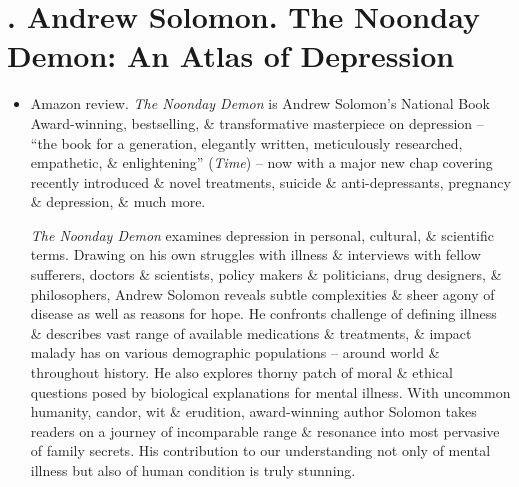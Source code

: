 \documentclass{article}
\begin{document}
\section{\cite{Solomon_depression}. {\sc Andrew Solomon}. The Noonday Demon: An Atlas of Depression}
{}
\begin{itemize}
	\item {\sf Amazon review.} {\it The Noonday Demon} is {\sc Andrew Solomon}'s National Book Award-winning, bestselling, \& transformative masterpiece on depression -- ``the book for a generation, elegantly written, meticulously researched, empathetic, \& enlightening'' ({\it Time}) -- now with a major new chap covering recently introduced \& novel treatments, suicide \& anti-depressants, pregnancy \& depression, \& much more.
	
	{\it The Noonday Demon} examines depression in personal, cultural, \& scientific terms. Drawing on his own struggles with illness \& interviews with fellow sufferers, doctors \& scientists, policy makers \& politicians, drug designers, \& philosophers, {\sc Andrew Solomon} reveals subtle complexities \& sheer agony of disease as well as reasons for hope. He confronts challenge of defining illness \& describes vast range of available medications \& treatments, \& impact malady has on various demographic populations -- around world \& throughout history. He also explores thorny patch of moral \& ethical questions posed by biological explanations for mental illness. With uncommon humanity, candor, wit \& erudition, award-winning author {\sc Solomon} takes readers on a journey of incomparable range \& resonance into most pervasive of family secrets. His contribution to our understanding not only of mental illness but also of human condition is truly stunning.


\end{itemize}
\end{document}

